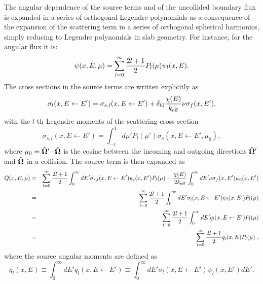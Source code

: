 The angular dependence of the source terms and of the uncollided boundary flux is expanded in a series of orthogonal Legendre polynomials as a consequence of the expansion of the scattering term in a series of orthogonal spherical harmonics, simply reducing to Legendre polynomials in slab geometry. For instance, for the angular flux it is:
\begin{equation}\label{eq:Q-series}
\psi(x,E,\mu) = \sum\limits_{l=0}^\infty {
	\frac{2l+1}{2} \ensuremath{P_l(\mu)} \psi_l(x,E)
}.
\end{equation}
The cross sections in the source terms are written explicitly as~\cite{Tomatis-2011}
\begin{equation}\label{eq:src-mmnts}
\sigma_l(x,E\leftarrow E') = \sigma_{s,l}(x,E\leftarrow E')
+ \delta_{l0}\frac{\chi(E)}{{k_{\textrm{\scriptsize{eff}}}}}\nu\sigma_f(x,E'),
\end{equation}
with the $l$-th Legendre moments of the scattering cross section
\begin{equation}\label{eq:src-mmnts-explicit}
\sigma_{s,l}(x,E\leftarrow E') = \int_{-1}^1 d\mu' P_l(\mu')\sigma_s(x,E\leftarrow E',\mu_0),
\end{equation}
where $\mu_0=\hat{\bm{\Omega}}'\cdot\hat{\bm{\Omega}}$ is the cosine between the incoming and outgoing directions $\hat{\bm{\Omega}}'$ and $\hat{\bm{\Omega}}$ in a collision. The source term is then expanded as
\begin{eqnarray}\label{eq:src}
Q(x,E,\mu)&=& \sum\limits_{l=0}^\infty {
	\frac{2l+1}{2} \int_0^\infty { dE'
		\sigma_{s,l}(x,E\leftarrow E')\psi_l(x,E')\ensuremath{P_l(\mu)} 			
	}
} 
+ \frac{\chi(E)}{2{k_{\textrm{\scriptsize{eff}}}}} \int_0^\infty { dE'
	\nu\sigma_f(x,E') \psi_0(x,E')
}  \nonumber \\
&=&\sum\limits_{l=0}^\infty {
	\frac{2l+1}{2} \int_0^\infty { dE'
		\sigma_l(x,E\leftarrow E')\psi_l(x,E')\ensuremath{P_l(\mu)} 			
	}
} \nonumber \\
&=&\sum\limits_{l=0}^\infty {
\frac{2l+1}{2} \int_0^\infty { dE'
	q_l(x,E\leftarrow E')\ensuremath{P_l(\mu)} 			
	}
} \nonumber \\
&=&\sum\limits_{l=0}^\infty {
	\frac{2l+1}{2} q_l(x,E)\ensuremath{P_l(\mu)} 			
} 
\,\, ,
\end{eqnarray}
where the source angular moments are defined as
\begin{equation}\label{eq:q_l}
q_l(x,E) \equiv \int_0^\infty dE' q_l(x,E\leftarrow E') \equiv 
\int_0^\infty dE' \sigma_l(x,E\leftarrow E')\psi_l(x,E') dE' .
\end{equation}

